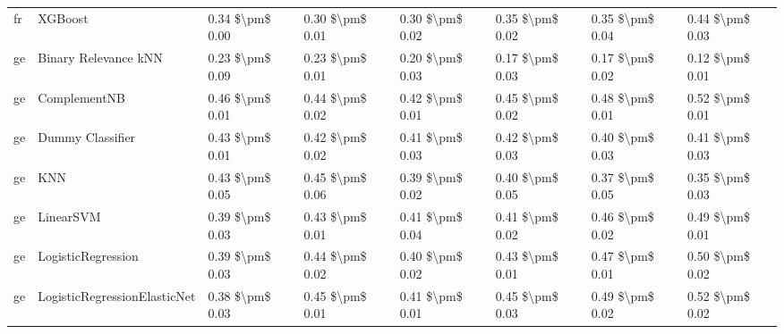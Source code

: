 \begin{tabular}{llllllll}
      fr &                         XGBoost & 0.34 \$\textbackslash pm\$ 0.00 &           0.30 \$\textbackslash pm\$ 0.01 &       0.30 \$\textbackslash pm\$ 0.02 &        0.35 \$\textbackslash pm\$ 0.02 &                         0.35 \$\textbackslash pm\$ 0.04 &     0.44 \$\textbackslash pm\$ 0.03 \\
      ge &            Binary Relevance kNN & 0.23 \$\textbackslash pm\$ 0.09 &           0.23 \$\textbackslash pm\$ 0.01 &       0.20 \$\textbackslash pm\$ 0.03 &        0.17 \$\textbackslash pm\$ 0.03 &                         0.17 \$\textbackslash pm\$ 0.02 &     0.12 \$\textbackslash pm\$ 0.01 \\
      ge &                    ComplementNB & 0.46 \$\textbackslash pm\$ 0.01 &           0.44 \$\textbackslash pm\$ 0.02 &       0.42 \$\textbackslash pm\$ 0.01 &        0.45 \$\textbackslash pm\$ 0.02 &                         0.48 \$\textbackslash pm\$ 0.01 &     0.52 \$\textbackslash pm\$ 0.01 \\
      ge &                Dummy Classifier & 0.43 \$\textbackslash pm\$ 0.01 &           0.42 \$\textbackslash pm\$ 0.02 &       0.41 \$\textbackslash pm\$ 0.03 &        0.42 \$\textbackslash pm\$ 0.03 &                         0.40 \$\textbackslash pm\$ 0.03 &     0.41 \$\textbackslash pm\$ 0.03 \\
      ge &                             KNN & 0.43 \$\textbackslash pm\$ 0.05 &           0.45 \$\textbackslash pm\$ 0.06 &       0.39 \$\textbackslash pm\$ 0.02 &        0.40 \$\textbackslash pm\$ 0.05 &                         0.37 \$\textbackslash pm\$ 0.05 &     0.35 \$\textbackslash pm\$ 0.03 \\
      ge &                       LinearSVM & 0.39 \$\textbackslash pm\$ 0.03 &           0.43 \$\textbackslash pm\$ 0.01 &       0.41 \$\textbackslash pm\$ 0.04 &        0.41 \$\textbackslash pm\$ 0.02 &                         0.46 \$\textbackslash pm\$ 0.02 &     0.49 \$\textbackslash pm\$ 0.01 \\
      ge &              LogisticRegression & 0.39 \$\textbackslash pm\$ 0.03 &           0.44 \$\textbackslash pm\$ 0.02 &       0.40 \$\textbackslash pm\$ 0.02 &        0.43 \$\textbackslash pm\$ 0.01 &                         0.47 \$\textbackslash pm\$ 0.01 &     0.50 \$\textbackslash pm\$ 0.02 \\
      ge &    LogisticRegressionElasticNet & 0.38 \$\textbackslash pm\$ 0.03 &           0.45 \$\textbackslash pm\$ 0.01 &       0.41 \$\textbackslash pm\$ 0.01 &        0.45 \$\textbackslash pm\$ 0.03 &                         0.49 \$\textbackslash pm\$ 0.02 &     0.52 \$\textbackslash pm\$ 0.02 \\

\end{tabular}
